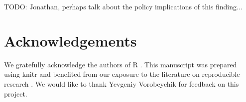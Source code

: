 \documentclass{article}\usepackage[]{graphicx}\usepackage[]{color}
\begin{document}
TODO: Jonathan, perhaps talk about the policy implications of this finding...

\section*{Acknowledgements}
We gratefully acknowledge the authors of \textsf{R} \cite{r_core}. This manuscript was prepared using knitr \cite{xie_knitr_2014} and benefited from our exposure to the literature on reproducible research \cite{stodden_reproducible_research_2014}. We would like to thank Yevgeniy Vorobeychik for feedback on this project.




\end{document}
